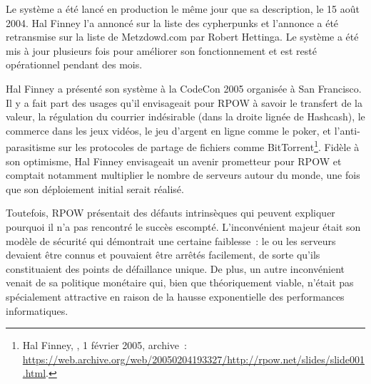 Le système a été lancé en production le même jour que sa description, le 15 août 2004. Hal Finney l'a annoncé sur la liste des cypherpunks et l'annonce a été retransmise sur la liste de Metzdowd.com par Robert Hettinga. Le système a été mis à jour plusieurs fois pour améliorer son fonctionnement et est resté opérationnel pendant des mois.

Hal Finney a présenté son système à la CodeCon 2005 organisée à San Francisco. Il y a fait part des usages qu'il envisageait pour RPOW à savoir le transfert de la valeur, la régulation du courrier indésirable (dans la droite lignée de Hashcash), le commerce dans les jeux vidéos, le jeu d'argent en ligne comme le poker, et l'anti-parasitisme sur les protocoles de partage de fichiers comme BitTorrent\footnote{Hal Finney, , 1\ier{} février 2005, archive~: \url{https://web.archive.org/web/20050204193327/http://rpow.net/slides/slide001.html}.}. Fidèle à son optimisme, Hal Finney envisageait un avenir prometteur pour RPOW et comptait notamment multiplier le nombre de serveurs autour du monde, une fois que son déploiement initial serait réalisé.

Toutefois, RPOW présentait des défauts intrinsèques qui peuvent expliquer pourquoi il n'a pas rencontré le succès escompté. L'inconvénient majeur était son modèle de sécurité qui démontrait une certaine faiblesse~: le ou les serveurs devaient être connus et pouvaient être arrêtés facilement, de sorte qu'ils constituaient des points de défaillance unique. De plus, un autre inconvénient venait de sa politique monétaire qui, bien que théoriquement viable, n'était pas spécialement attractive en raison de la hausse exponentielle des performances informatiques.

